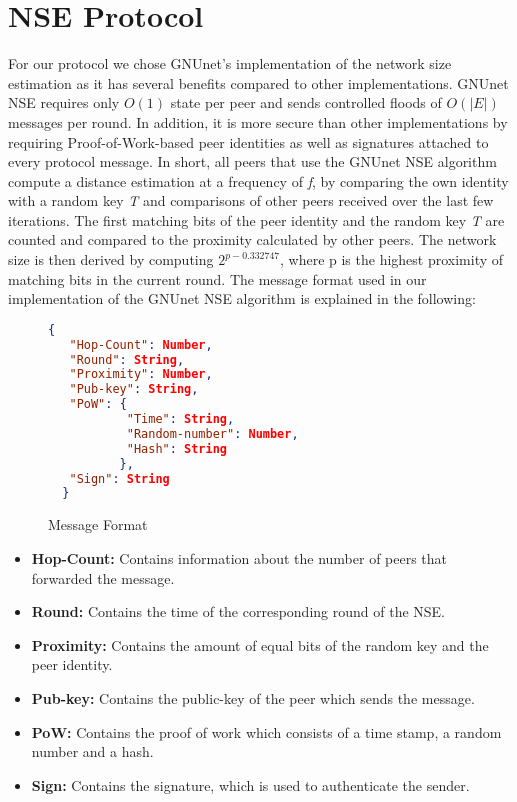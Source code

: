 \documentclass[IN,11pt,oneside,openright,english]{article}
\begin{document}
\section{NSE Protocol}
For our protocol we chose GNUnet's implementation of the network size estimation \cite{nse:1} as it has several benefits compared to other implementations. GNUnet NSE requires only $O(1)$ state per peer and sends controlled floods of $O(|E|)$ messages per round. In addition, it is more secure than other implementations by requiring Proof-of-Work-based peer identities as well as signatures attached to every protocol message. \newline
\newline In short, all peers that use the GNUnet NSE algorithm compute a distance estimation at a frequency of \textit{f}, by comparing the own identity with a random key \textit{T} and comparisons of other peers received over the last few iterations. The first matching bits of the peer identity and the random key \textit{T} are counted and compared to the proximity calculated by other peers. The network size is then derived by computing $2^{p-0.332747}$, where p is the highest proximity of matching bits in the current round. \newline
\newline The message format used in our implementation of the GNUnet NSE algorithm is explained in the following:

\begin{figure}[!h]
  \centering
  \begin{lstlisting}[language=json,firstnumber=1]
  {
   "Hop-Count": Number,
   "Round": String,
   "Proximity": Number,
   "Pub-key": String,
   "PoW": {
           "Time": String,
           "Random-number": Number,
           "Hash": String
          },
   "Sign": String
  }
  \end{lstlisting}
\caption{Message Format}
\end{figure}

\newpage 

\begin{itemize}
\item \textbf{Hop-Count:} Contains information about the number of peers that forwarded the message.
\item \textbf{Round:} Contains the time of the corresponding round of the NSE.
\item \textbf{Proximity:} Contains the amount of equal bits of the random key and the peer identity.
\item \textbf{Pub-key:} Contains the public-key of the peer which sends the message.
\item \textbf{PoW:} Contains the proof of work which consists of a time stamp, a random number and a hash.
\item \textbf{Sign:} Contains the signature, which is used to authenticate the sender.
\end{itemize}
\end{document}
